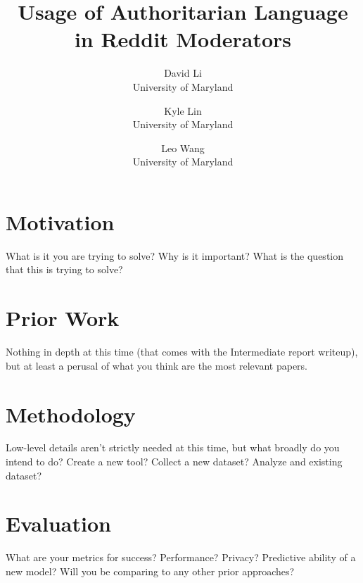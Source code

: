 \documentclass[letterpaper,twocolumn,10pt]{article}
\begin{document}

\date{}

\title{\Large \bf Usage of Authoritarian Language in Reddit Moderators}

\author{ %
{\rm David Li}\\
University of Maryland
\and
{\rm Kyle Lin}\\
University of Maryland
\and
{\rm Leo Wang}\\
University of Maryland
}

\maketitle

\section{Motivation}

What is it you are trying to solve?
Why is it important?
What is the question that this is trying to solve?

\section{Prior Work}

Nothing in depth at this time (that comes with the Intermediate report writeup), but at least a perusal of what you think are the most relevant papers.

\section{Methodology}

Low-level details aren't strictly needed at this time, but what broadly do you intend to do? Create a new tool? Collect a new dataset? Analyze and existing dataset?

\section{Evaluation}

What are your metrics for success? Performance? Privacy? Predictive ability of a new model?
Will you be comparing to any other prior approaches?

\end{document}
